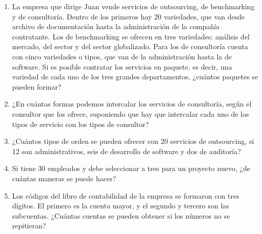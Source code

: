 \begin{Ejer}
\begin{enumerate}

\end{enumerate}
\end{Ejer}

\begin{Ejer}
\begin{enumerate}

\item La empresa que dirige Juan vende servicios de outsourcing, de benchmarking y de consultor\'ia. Dentro de los primeros hay 20 variedades, que van desde archivo de documentaci\'on hasta la administraci\'on de la compa\~n\'ia contratante. Los de benchmarking se ofrecen en tres variedades: an\'alisis del mercado, del sector y del sector globalizado. Para los de consultor\'ia cuenta con cinco variedades o tipos, que van de la administraci\'on hasta la de software. Si es posible contratar los servicios en paquete, es decir, una variedad de cada uno de los tres grandes departamentos, ¿cu\'antos paquetes se pueden formar?

\item ¿En cu\'antas formas podemos intercalar los servicios de consultor\'ia, seg\'un el consultor que los ofrece, suponiendo que hay que intercalar cada uno de los tipos de servicio con los tipos de consultor?

\item ¿Cu\'antos tipos de orden se pueden ofrecer con 20 servicios de outsourcing, si 12 son administrativos, seis de desarrollo de software y dos de auditor\'ia?

\item Si tiene 30 empleados y debe seleccionar a tres para un proyecto nuevo, ¿de cu\'antas maneras se puede hacer?

\item Los c\'odigos del libro de contabilidad de la empresa se formaron con tres d\'igitos. El primero es la cuenta mayor, y el segundo y tercero son las subcuentas. ¿Cu\'antas cuentas se pueden obtener si los n\'umeros no se repitieran?


\end{enumerate}
\end{Ejer}
